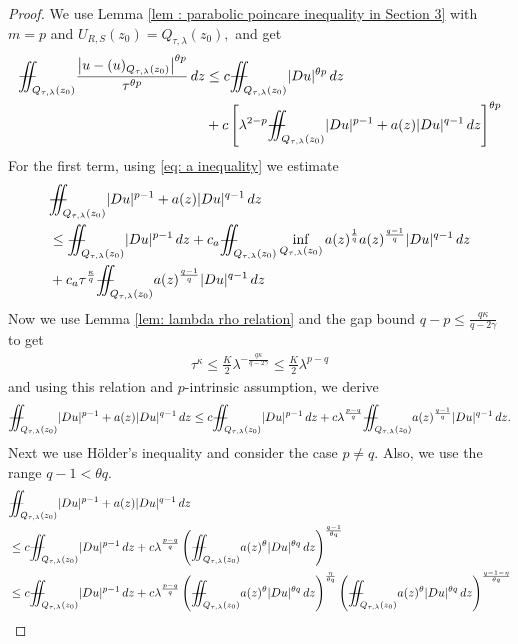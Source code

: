 \documentclass[notitlepage,11pt,reqno]{amsart}
\theoremstyle{definition}
\numberwithin{equation}{section}
\newcommand{\iintss}{{\int\hspace{-0.28cm}\int}}
\newcommand{ \miints }{{\iintss\hspace{-0.56cm} -\hspace{-0.15cm}-}}
\newcommand{\miint}[1]{{\miints_{\hspace{-0.13cm}#1}}}
\begin{document}
\begin{proof} We use Lemma \ref{lem : parabolic poincare inequality in Section 3} with $m=p$ and $U_{R, S}(z_0)=Q_{\tau, \lambda}(z_0),$ and get
 \begin{align}\label{eq: 2.5}
     \miint{Q_{\tau, \lambda}(z_0)}\frac{\left|u-(u)_{Q_{\tau, \lambda}(z_0)}\right|^{\theta p}}{\tau^{\theta p}}\, dz &\leq c\miint{Q_{\tau, \lambda}(z_0)}|Du|^{\theta p}\, dz\nonumber\\
     &+ c \left[\lambda^{2-p}\miint{Q_{\tau, \lambda}(z_0)}|Du|^{p-1}+a(z)|Du|^{q-1}\, dz\right]^{\theta p}
 \end{align}
 For the first term, using \eqref{eq: a inequality} we estimate
 \begin{align*}
& \miint{Q_{\tau, \lambda}(z_0)}|Du|^{p-1}+a(z)|Du|^{q-1}\, dz\\
 &\leq   \miint{Q_{\tau, \lambda}(z_0)}|Du|^{p-1}\, dz+c_a \miint{Q_{\tau, \lambda}(z_0)}\inf_{Q_{\tau, \lambda}(z_0)} a(z)^{\frac{1}{q}}a(z)^{\frac{q-1}{q}}|Du|^{q-1}\, dz \\
 &+c_a \tau^{\frac{\kappa}{q}}\miint{Q_{\tau, \lambda}(z_0)}a(z)^{\frac{q-1}{q}}|Du|^{q-1}\, dz
 \end{align*}
  Now we use Lemma \ref{lem: lambda rho relation} and the gap bound $q-p\le \frac{q\kappa}{q-2\gamma}$ to get
  \begin{align}\label{eq: lambda_rho_relation_2}
   \tau^{\kappa}\leq \frac{K}{2}\lambda ^{-\frac{q\kappa}{q-2\gamma}}\leq\frac{K}{2}\lambda^{p-q}   
  \end{align}
  and using this relation and $p$-intrinsic assumption, we derive
 \begin{align*}
\miint{Q_{\tau, \lambda}(z_0)}|Du|^{p-1}+a(z)|Du|^{q-1}\, dz \leq c \miint{Q_{\tau, \lambda}(z_0)}|Du|^{p-1}\, dz+ c \lambda^{\frac{p-q}{q}}\miint{Q_{\tau, \lambda}(z_0)} a(z)^{\frac{q-1}{q}} |Du|^{q-1}\, dz.    
 \end{align*}
 Next we use H\"{o}lder's inequality and consider the case $p\neq q.$ Also, we use the range $q-1<\theta q.$
 \begin{align*}
  &\miint{Q_{\tau, \lambda}(z_0)}|Du|^{p-1}+a(z)|Du|^{q-1}\, dz\\
  &\leq c \miint{Q_{\tau, \lambda}(z_0)}|Du|^{p-1}\, dz+ c \lambda^{\frac{p-q}{q}}\left(\miint{Q_{\tau, \lambda}(z_0)} a(z)^{\theta} |Du|^{\theta q}\, dz\right)^{\frac{q-1}{\theta q}}\\
  &\leq c \miint{Q_{\tau, \lambda}(z_0)}|Du|^{p-1}\, dz+ c\lambda^{\frac{p-q}{q}}\left(\miint{Q_{\tau, \lambda}(z_0)}a(z)^{\theta}|Du|^{\theta q}\, dz\right)^{\frac{\eta}{\theta q}}   \left(\miint{Q_{\tau, \lambda}(z_0)}a(z)^{\theta}|Du|^{\theta q}\, dz\right)^{\frac{q-1-\eta}{\theta q}}\\

\end{align*}
\end{proof}
\end{document}
